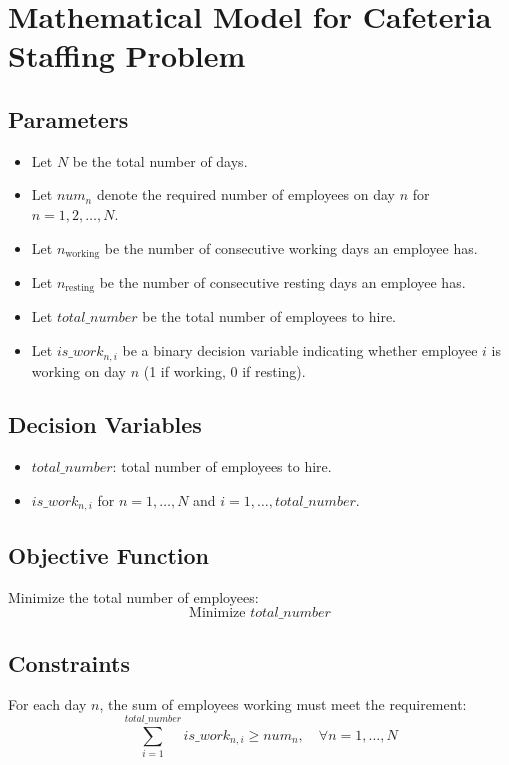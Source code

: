 \documentclass{article}
\begin{document}
\section*{Mathematical Model for Cafeteria Staffing Problem}

\subsection*{Parameters}
\begin{itemize}
    \item Let \( N \) be the total number of days.
    \item Let \( num_n \) denote the required number of employees on day \( n \) for \( n = 1, 2, \ldots, N \).
    \item Let \( n_{\text{working}} \) be the number of consecutive working days an employee has.
    \item Let \( n_{\text{resting}} \) be the number of consecutive resting days an employee has.
    \item Let \( total\_number \) be the total number of employees to hire.
    \item Let \( is\_work_{n,i} \) be a binary decision variable indicating whether employee \( i \) is working on day \( n \) (1 if working, 0 if resting).
\end{itemize}

\subsection*{Decision Variables}
\begin{itemize}
    \item \( total\_number \): total number of employees to hire.
    \item \( is\_work_{n,i} \) for \( n = 1, \ldots, N \) and \( i = 1, \ldots, total\_number \).
\end{itemize}

\subsection*{Objective Function}
Minimize the total number of employees:
\[
\text{Minimize } total\_number
\]

\subsection*{Constraints}
For each day \( n \), the sum of employees working must meet the requirement:
\[
\sum_{i=1}^{total\_number} is\_work_{n,i} \geq num_n, \quad \forall n = 1, \ldots, N
\]
\end{document}
